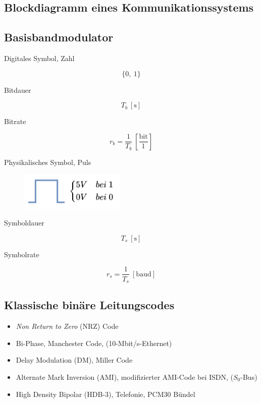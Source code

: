 \documentclass[
  10pt,
  a4paper,
  german]{article}
\providecommand{\tightlist}{%
  \setlength{\itemsep}{0pt}\setlength{\parskip}{0pt}}\usepackage{longtable,booktabs,array}
\numberwithin{equation}{section}
\begin{document}
\hypertarget{blockdiagramm-eines-kommunikationssystems}{%
\subsection{Blockdiagramm eines
Kommunikationssystems}\label{blockdiagramm-eines-kommunikationssystems}}

\hypertarget{basisbandmodulator}{%
\subsection{Basisbandmodulator}\label{basisbandmodulator}}

\begin{multicols}{2}

Digitales Symbol, \textcolor{NavyBlue}{Zahl}

\[
\{0,\ 1\}
\]

Bitdauer

\[
T_b\ [\text{s}]
\]

Bitrate

\[
r_b=\frac{1}{T_b}\ \left[\frac{\text{bit}}{\text{1}}\right]
\]

Physikalisches Symbol, \textcolor{NavyBlue}{Puls}

\begin{figure}[H]

{\centering \includegraphics[width=5cm,height=\textheight]{images/05_basisbandmodulator_puls.png}

}

\end{figure}

Symboldauer

\[
T_s\ [\text{s}]
\]

Symbolrate

\[
r_s = \frac{1}{T_s}\ [\text{baud}]
\]

\end{multicols}

\hypertarget{klassische-binuxe4re-leitungscodes}{%
\subsection{Klassische binäre
Leitungscodes}\label{klassische-binuxe4re-leitungscodes}}

\begin{itemize}
\tightlist
\item
  \emph{Non Return to Zero} (NRZ) Code
\item
  Bi-Phase, Manchester Code, (10-Mbit/s-Ethernet)
\item
  Delay Modulation (DM), Miller Code
\item
  Alternate Mark Inversion (AMI), modifizierter AMI-Code bei ISDN,
  (\(S_0\)-Bus)
\item
  High Density Bipolar (HDB-3), Telefonie, PCM30 Bündel
\end{itemize}
\end{document}
